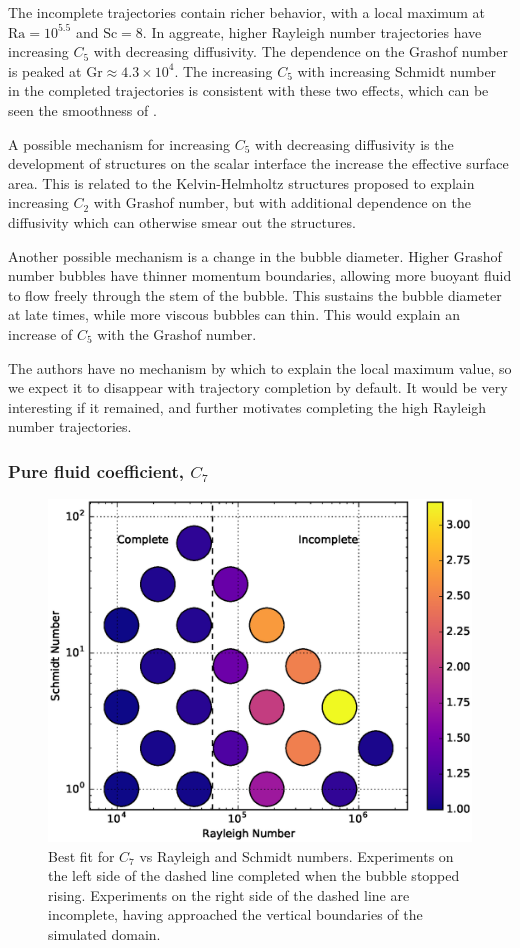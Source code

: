The incomplete trajectories contain richer behavior, with a local maximum at $\text{Ra} = 10^{5.5}$ and $\text{Sc} = 8$.
In aggreate, higher Rayleigh number trajectories have increasing $C_5$ with decreasing diffusivity.
The dependence on the Grashof number is peaked at $\text{Gr} \approx 4.3 \times 10^4$.
The increasing $C_5$ with increasing Schmidt number in the completed trajectories is consistent with these two effects, which can be seen the smoothness of .

A possible mechanism for increasing $C_5$ with decreasing diffusivity is the development of structures on the scalar interface the increase the effective surface area.
This is related to the Kelvin-Helmholtz structures proposed to explain increasing $C_2$ with Grashof number, but with additional dependence on the diffusivity which can otherwise smear out the structures.

Another possible mechanism is a change in the bubble diameter.
Higher Grashof number bubbles have thinner momentum boundaries, allowing more buoyant fluid to flow freely through the stem of the bubble.
This sustains the bubble diameter at late times, while more viscous bubbles can thin.
This would explain an increase of $C_5$ with the Grashof number.

The authors have no mechanism by which to explain the local maximum value, so we expect it to disappear with trajectory completion by default.
It would be very interesting if it remained, and further motivates completing the high Rayleigh number trajectories.

\subsubsection{Pure fluid coefficient, $C_7$}
\begin{figure}
\includegraphics[width=\columnwidth]{figs/C7-vs-Rayleigh-Schmidt}
\caption{ 
  Best fit for $C_7$ vs Rayleigh and Schmidt numbers.
  Experiments on the left side of the dashed line completed when the bubble stopped rising.
  Experiments on the right side of the dashed line are incomplete, having approached the vertical boundaries of the simulated domain.
}
\end{figure}

